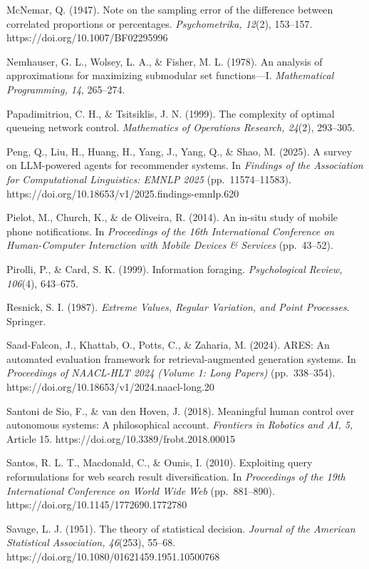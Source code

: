 \documentclass[
  11pt]{article}
\begin{document}
McNemar, Q. (1947). Note on the sampling error of the difference between
correlated proportions or percentages. \emph{Psychometrika, 12}(2),
153--157. https://doi.org/10.1007/BF02295996

Nemhauser, G. L., Wolsey, L. A., \& Fisher, M. L. (1978). An analysis of
approximations for maximizing submodular set functions---I.
\emph{Mathematical Programming, 14}, 265--274.

Papadimitriou, C. H., \& Tsitsiklis, J. N. (1999). The complexity of
optimal queueing network control. \emph{Mathematics of Operations
Research, 24}(2), 293--305.

Peng, Q., Liu, H., Huang, H., Yang, J., Yang, Q., \& Shao, M. (2025). A
survey on LLM-powered agents for recommender systems. In \emph{Findings
of the Association for Computational Linguistics: EMNLP 2025}
(pp.~11574--11583). https://doi.org/10.18653/v1/2025.findings-emnlp.620

Pielot, M., Church, K., \& de Oliveira, R. (2014). An in-situ study of
mobile phone notifications. In \emph{Proceedings of the 16th
International Conference on Human-Computer Interaction with Mobile
Devices \& Services} (pp.~43--52).

Pirolli, P., \& Card, S. K. (1999). Information foraging.
\emph{Psychological Review, 106}(4), 643--675.

Resnick, S. I. (1987). \emph{Extreme Values, Regular Variation, and
Point Processes}. Springer.

Saad-Falcon, J., Khattab, O., Potts, C., \& Zaharia, M. (2024). ARES: An
automated evaluation framework for retrieval-augmented generation
systems. In \emph{Proceedings of NAACL-HLT 2024 (Volume 1: Long Papers)}
(pp.~338--354). https://doi.org/10.18653/v1/2024.naacl-long.20

Santoni de Sio, F., \& van den Hoven, J. (2018). Meaningful human
control over autonomous systems: A philosophical account.
\emph{Frontiers in Robotics and AI, 5}, Article 15.
https://doi.org/10.3389/frobt.2018.00015

Santos, R. L. T., Macdonald, C., \& Ounis, I. (2010). Exploiting query
reformulations for web search result diversification. In
\emph{Proceedings of the 19th International Conference on World Wide
Web} (pp.~881--890). https://doi.org/10.1145/1772690.1772780

Savage, L. J. (1951). The theory of statistical decision. \emph{Journal
of the American Statistical Association, 46}(253), 55--68.
https://doi.org/10.1080/01621459.1951.10500768
\end{document}
